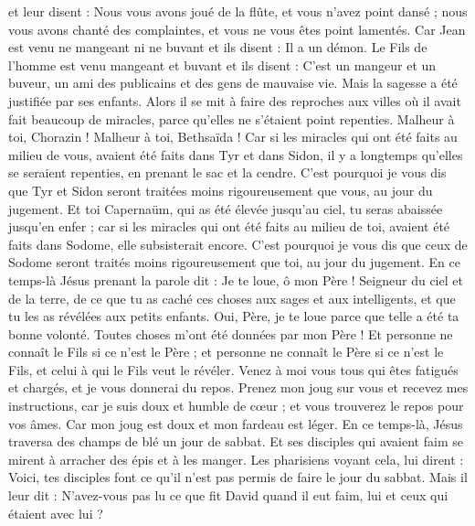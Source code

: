 \begin{multicols}{2}
et leur disent : Nous vous avons joué de la flûte, et vous n'avez point dansé ; nous vous avons chanté des complaintes, et vous ne vous êtes point lamentés.
Car Jean est venu ne mangeant ni ne buvant et ils disent : Il a un démon.
Le Fils de l'homme est venu mangeant et buvant et ils disent : C’est un mangeur et un buveur, un ami des publicains et des gens de mauvaise vie. Mais la sagesse a été justifiée par ses enfants.
Alors il se mit à faire des reproches aux villes où il avait fait beaucoup de miracles, parce qu’elles ne s'étaient point repenties.
Malheur à toi, Chorazin ! Malheur à toi, Bethsaïda ! Car si les miracles qui ont été faits au milieu de vous, avaient été faits dans Tyr et dans Sidon, il y a longtemps qu'elles se seraient repenties, en prenant le sac et la cendre.
C'est pourquoi je vous dis que Tyr et Sidon seront traitées moins rigoureusement que vous, au jour du jugement.
Et toi Capernaüm, qui as été élevée jusqu’au ciel, tu seras abaissée jusqu’en enfer ; car si les miracles qui ont été faits au milieu de toi, avaient été faits dans Sodome, elle subsisterait encore.
C'est pourquoi je vous dis que ceux de Sodome seront traités moins rigoureusement que toi, au jour du jugement.
En ce temps-là Jésus prenant la parole dit : Je te loue, ô mon Père ! Seigneur du ciel et de la terre, de ce que tu as caché ces choses aux sages et aux intelligents, et que tu les as révélées aux petits enfants.
Oui, Père, je te loue parce que telle a été ta bonne volonté.
Toutes choses m'ont été données par mon Père ! Et personne ne connaît le Fils si ce n’est le Père ; et personne ne connaît le Père si ce n’est le Fils, et celui à qui le Fils veut le révéler.
Venez à moi vous tous qui êtes fatigués et chargés, et je vous donnerai du repos.
Prenez mon joug sur vous et recevez mes instructions, car je suis doux et humble de cœur ; et vous trouverez le repos pour vos âmes.
Car mon joug est doux et mon fardeau est léger.
\VerseOne{}En ce temps-là, Jésus traversa des champs de blé un jour de sabbat. Et ses disciples qui avaient faim se mirent à arracher des épis et à les manger.
Les pharisiens voyant cela, lui dirent : Voici, tes disciples font ce qu'il n'est pas permis de faire le jour du sabbat.
Mais il leur dit : N'avez-vous pas lu ce que fit David quand il eut faim, lui et ceux qui étaient avec lui ?

\end{multicols}
